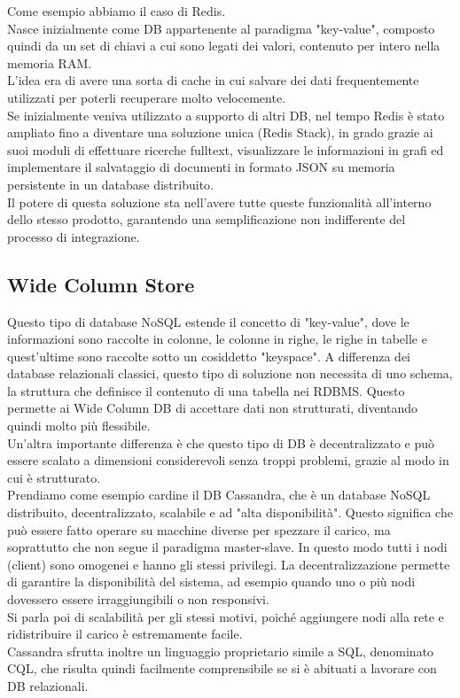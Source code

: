 \noindent Come esempio abbiamo il caso di Redis.\\
Nasce inizialmente come DB appartenente al paradigma "key-value", composto quindi da un set di chiavi a cui sono legati dei valori, contenuto per intero nella memoria RAM.\\
L'idea era di avere una sorta di cache in cui salvare dei dati frequentemente utilizzati per poterli recuperare molto velocemente.\\
Se inizialmente veniva utilizzato a supporto di altri DB, nel tempo Redis è stato ampliato fino a diventare una soluzione unica (Redis Stack), in grado grazie ai suoi moduli di effettuare ricerche fulltext, visualizzare le informazioni in grafi ed implementare il salvataggio di documenti in formato JSON su memoria persistente in un database distribuito.\\
Il potere di questa soluzione sta nell'avere tutte queste funzionalità all'interno dello stesso prodotto, garantendo una semplificazione non indifferente del processo di integrazione.


\subsection{Wide Column Store}
Questo tipo di database NoSQL estende il concetto di "key-value", dove le informazioni sono raccolte in colonne, le colonne in righe, le righe in tabelle e quest'ultime sono raccolte sotto un cosiddetto "keyspace". A differenza dei database relazionali classici, questo tipo di soluzione non necessita di uno schema, la struttura che definisce il contenuto di una tabella nei RDBMS. Questo permette ai Wide Column DB di accettare dati non strutturati, diventando quindi molto più flessibile.\\
Un'altra importante differenza è che questo tipo di DB è decentralizzato e può essere scalato a dimensioni considerevoli senza troppi problemi, grazie al modo in cui è strutturato.\\

\noindent Prendiamo come esempio cardine il DB Cassandra, che è un database NoSQL distribuito, decentralizzato, scalabile e ad "alta disponibilità". Questo significa che può essere fatto operare su macchine diverse per spezzare il carico, ma soprattutto che non segue il paradigma master-slave. In questo modo tutti i nodi (client) sono omogenei e hanno gli stessi privilegi. La decentralizzazione permette di garantire la disponibilità del sistema, ad esempio quando uno o più nodi dovessero essere irraggiungibili o non responsivi.\\
Si parla poi di scalabilità per gli stessi motivi, poiché aggiungere nodi alla rete e ridistribuire il carico è estremamente facile.\\
Cassandra sfrutta inoltre un linguaggio proprietario simile a SQL, denominato CQL, che risulta quindi facilmente comprensibile se si è abituati a lavorare con DB relazionali.\\

